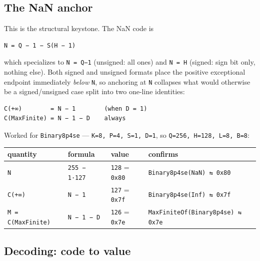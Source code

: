 \subsection{The NaN anchor}



\label{2920805518277066309}{}


This is the structural keystone. The NaN code is




\begin{verbatim}
N = Q − 1 − S(H − 1)
\end{verbatim}



which specializes to \texttt{N = Q−1} (unsigned: all ones) and \texttt{N = H} (signed: sign bit only, nothing else). Both signed and unsigned formats place the positive exceptional endpoint immediately \emph{below} \texttt{N}, so anchoring at \texttt{N} collapses what would otherwise be a signed/unsigned case split into two one-line identities:




\nopagebreak[4]
\begin{verbatim}
C(+∞)        = N − 1        (when D = 1)
C(MaxFinite) = N − 1 − D    always
\end{verbatim}



Worked for \texttt{Binary8p4se} — \texttt{K=8, P=4, S=1, D=1}, so \texttt{Q=256, H=128, L=8, B=8}:




\begin{table}[h]
\centering
\begin{tabulary}{\linewidth}{L L L L}
\toprule
quantity & formula & value & confirms \\
\toprule
\texttt{N} & \texttt{255 − 1·127} & \texttt{128} = \texttt{0x80} & \texttt{Binary8p4se(NaN) ⇆ 0x80} \\
\texttt{C(+∞)} & \texttt{N − 1} & \texttt{127} = \texttt{0x7f} & \texttt{Binary8p4se(Inf) ⇆ 0x7f} \\
\texttt{M = C(MaxFinite)} & \texttt{N − 1 − D} & \texttt{126} = \texttt{0x7e} & \texttt{MaxFiniteOf(\allowbreak{}Binary8p4se) ⇆ 0x7e} \\
\bottomrule
\end{tabulary}

\end{table}



\subsection{Decoding: code to value}



